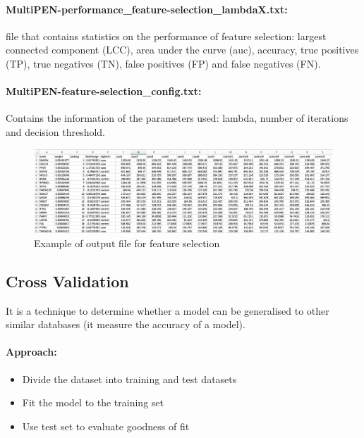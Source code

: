 \documentclass[11pt, oneside]{article}   	%
\begin{document}
\paragraph{MultiPEN-performance\_feature-selection\_lambdaX.txt:} file that contains statistics on the performance of feature selection: largest connected component (LCC), area under the curve (auc), accuracy, true positives (TP), true negatives (TN), false positives (FP) and false negatives (FN).

\paragraph{MultiPEN-feature-selection\_config.txt:} Contains the information of the parameters used: lambda, number of iterations and decision threshold.



\begin{figure}[!h]
	\centering
	\includegraphics[width=\textwidth]{example_output_rankings}
	\caption{Example of output file for feature selection}
	\label{fig:example_output_rankings}
\end{figure}



\subsection{Cross Validation}

It is a technique to determine whether a model can be generalised to other similar databases (it measure the accuracy of a model).

\paragraph{Approach:}


\begin{itemize}

   \item Divide the dataset into training and test datasets
   
   \item Fit the model to the training set
   
   \item Use test set to evaluate goodness of fit
   
\end{itemize}
\end{document}
